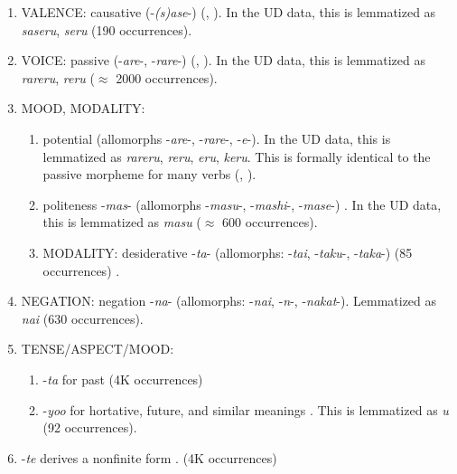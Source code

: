 \documentclass[11pt,letterpaper]{article}
\begin{document}
\begin{enumerate}
	\item VALENCE: causative (-\textit{(s)ase}-) (\citet[142]{hasegawa2014japanese}, \citet[Chapter 13]{kaiser2013japanese}). In the UD data, this is lemmatized as \textit{saseru}, \textit{seru} (190 occurrences).
	\item VOICE: passive (-\textit{are}-, -\textit{rare}-) (\citet[152]{hasegawa2014japanese}, \citet[Chapter 12]{kaiser2013japanese}).  In the UD data, this is lemmatized as \textit{rareru}, \textit{reru} ($\approx$ 2000 occurrences).
\item MOOD, MODALITY:
\begin{enumerate}
\item potential (allomorphs -\textit{are}-, -\textit{rare}-, -\textit{e}-). In the UD data, this is lemmatized as \textit{rareru}, \textit{reru}, \textit{eru}, \textit{keru}.
This is formally identical to the passive morpheme for many verbs (\citet[346]{vaccari1938complete}, \citet[398]{kaiser2013japanese}).



\item politeness -\textit{mas}- (allomorphs -\textit{masu}-, -\textit{mashi}-, -\textit{mase}-) \cite[190]{kaiser2013japanese}. %
In the UD data, this is lemmatized as \textit{masu} ($\approx$ 600 occurrences).
\item MODALITY: desiderative -\textit{ta}- (allomorphs: -\textit{tai}, -\textit{taku}-, -\textit{taka}-) (85 occurrences) \cite[238]{kaiser2013japanese}. %
\end{enumerate}
\item NEGATION: negation -\textit{na}- (allomorphs: -\textit{nai}, -\textit{n}-, -\textit{nakat}-). 
Lemmatized as \textit{nai} (630 occurrences).
\item TENSE/ASPECT/MOOD:
\begin{enumerate}
\item -\textit{ta} for past (4K occurrences) \cite[211]{kaiser2013japanese}
\item -\textit{yoo} for hortative, future, and similar meanings \cite[229]{kaiser2013japanese}. This is lemmatized as \textit{u} (92 occurrences).
\end{enumerate}
\item -\textit{te} derives a nonfinite form \cite[186]{kaiser2013japanese}. (4K occurrences)
\end{enumerate}
\end{document}
